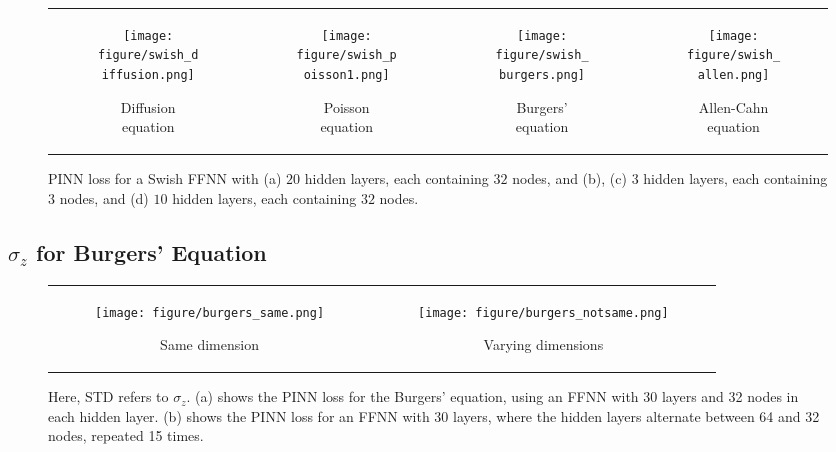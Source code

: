\documentclass{article} \usepackage{iclr2025_conference,times}
\begin{document}
\begin{figure}[h!]
\centering 
\begin{tabular}{cccc}
\begin{subfigure}[b]{0.23\textwidth}
    \centering
    \texttt{[image: figure/swish\_diffusion.png]}
    \caption{Diffusion equation}
\end{subfigure} &
\begin{subfigure}[b]{0.23\textwidth}
    \centering
    \texttt{[image: figure/swish\_poisson1.png]}
    \caption{Poisson equation}
\end{subfigure} 
 &
\begin{subfigure}[b]{0.23\textwidth}
    \centering
    \texttt{[image: figure/swish\_burgers.png]}
    \caption{Burgers' equation}
\end{subfigure} 
 &
\begin{subfigure}[b]{0.23\textwidth}
    \centering
    \texttt{[image: figure/swish\_allen.png]}
    \caption{Allen-Cahn equation}
\end{subfigure} 
\end{tabular}
\caption{PINN loss for a Swish FFNN with (a) $20$ hidden layers, each containing $32$ nodes, and (b), (c) $3$ hidden layers, each containing $3$ nodes, and (d) $10$ hidden layers, each containing $32$ nodes.}
\label{fig:acti22}
\end{figure}

\subsection{$\sigma_z$ for Burgers' Equation}\label{app1}


\begin{figure}[h!]
\centering 
\begin{tabular}{cc}
\begin{subfigure}[b]{0.48\textwidth}
    \centering
    \texttt{[image: figure/burgers\_same.png]}
    \caption{Same dimension}
\end{subfigure} &
\begin{subfigure}[b]{0.48\textwidth}
    \centering
    \texttt{[image: figure/burgers\_notsame.png]}
    \caption{Varying dimensions}
\end{subfigure} 
\end{tabular}
\caption{Here, STD refers to \(\sigma_z\). (a) shows the PINN loss for the Burgers' equation, using an FFNN with 30 layers and 32 nodes in each hidden layer. (b) shows the PINN loss for an FFNN with 30 layers, where the hidden layers alternate between 64 and 32 nodes, repeated 15 times. }
\label{fig:Activation_distribution2}
\end{figure}
\end{document}
